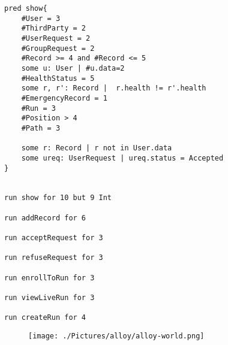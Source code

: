 \begin{verbatim}
pred show{
	#User = 3
	#ThirdParty = 2
	#UserRequest = 2
	#GroupRequest = 2
	#Record >= 4 and #Record <= 5
	some u: User | #u.data=2
	#HealthStatus = 5
	some r, r': Record |  r.health != r'.health
	#EmergencyRecord = 1
	#Run = 3
	#Position > 4
	#Path = 3
	
	some r: Record | r not in User.data
	some ureq: UserRequest | ureq.status = Accepted
}


run show for 10 but 9 Int

run addRecord for 6

run acceptRequest for 3

run refuseRequest for 3

run enrollToRun for 3

run viewLiveRun for 3

run createRun for 4

\end{verbatim}

\newpage

\begin{figure}[H]
    \centering
    \texttt{[image: ./Pictures/alloy/alloy-world.png]}
\end{figure}


